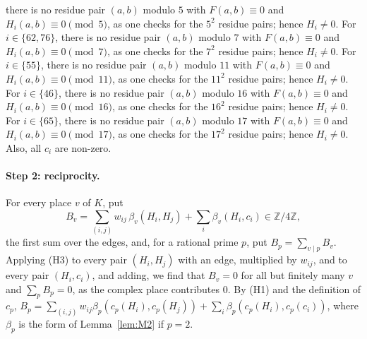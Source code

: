 \documentclass[11pt]{article}
\newcommand{\Z}{\mathbb{Z}}
\begin{document}
there is no residue pair $(a,b)$ modulo $5$ with $F(a,b)\equiv0$ and $H_i(a,b)\equiv0\pmod{5}$, as one checks for the $5^2$ residue pairs; hence $H_i\neq0$. For $i\in\{62,\allowbreak 76\}$, there is no residue pair $(a,b)$ modulo $7$ with $F(a,b)\equiv0$ and $H_i(a,b)\equiv0\pmod{7}$, as one checks for the $7^2$ residue pairs; hence $H_i\neq0$. For $i\in\{55\}$, there is no residue pair $(a,b)$ modulo $11$ with $F(a,b)\equiv0$ and $H_i(a,b)\equiv0\pmod{11}$, as one checks for the $11^2$ residue pairs; hence $H_i\neq0$. For $i\in\{46\}$, there is no residue pair $(a,b)$ modulo $16$ with $F(a,b)\equiv0$ and $H_i(a,b)\equiv0\pmod{16}$, as one checks for the $16^2$ residue pairs; hence $H_i\neq0$. For $i\in\{65\}$, there is no residue pair $(a,b)$ modulo $17$ with $F(a,b)\equiv0$ and $H_i(a,b)\equiv0\pmod{17}$, as one checks for the $17^2$ residue pairs; hence $H_i\neq0$. Also, all $c_i$ are non-zero.

\paragraph{Step 2: reciprocity.} For every place $v$ of $K$, put
\begin{equation}\label{eq:B}
B_v=\sum_{(i,j)}w_{ij}\,\beta_v(H_i,H_j)+\sum_i\beta_v(H_i,c_i)\in\Z/4\Z,
\end{equation}
the first sum over the edges, and, for a rational prime $p$, put $B_p=\sum_{v\mid p}B_v$. Applying (H3) to every pair $(H_i,H_j)$ with an edge, multiplied by $w_{ij}$, and to every pair $(H_i,c_i)$, and adding, we find that $B_v=0$ for all but finitely many $v$ and $\sum_pB_p=0$, as the complex place contributes $0$. By (H1) and the definition of $c_p$, $B_p=\sum_{(i,j)}w_{ij}\beta_p(c_p(H_i),c_p(H_j))+\sum_i\beta_p(c_p(H_i),c_p(c_i))$, where $\beta_p$ is the form of Lemma~\ref{lem:M2} if $p=2$.
\end{document}
